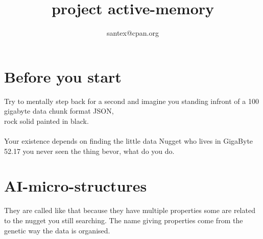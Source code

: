 \documentclass[11pt]{article}
\title{\textbf{project active-memory}}
\author{santex@cpan.org}
\date{}
\begin{document}
\maketitle

\section{Before you start}

Try to mentally step back for a second and imagine you standing infront of a 100 gigabyte data chunk format JSON,\\
rock solid painted in black.\\\\
Your existence depends on finding the little data Nugget who lives in GigaByte 52.17
you never seen the thing bevor,
what do you do.



\section{AI-micro-structures}
They are called like that because they have multiple properties some are related to the nugget you still searching. The name giving properties come from the genetic way the data is organised.
\end{document}
